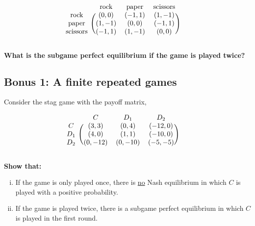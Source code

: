 \documentclass[10pt]{article}
\begin{document}
\begin{equation*}
    \begin{blockarray}{cccc}
        & \text{rock} & \text{paper} & \text{scissors} \\
        \begin{block}{c(ccc)}
            \text{rock}     & (0, 0)  & (-1, 1) & (1, -1) \\
            \text{paper}    & (1, -1) & (0, 0) & (-1, 1) \\
            \text{scissors} & (-1, 1) & (1, -1) & (0, 0) \\
        \end{block}
    \end{blockarray}\qquad
\end{equation*}

\textbf{What is the subgame perfect equilibrium if the game is played twice?}

\subsection*{Bonus 1: A finite repeated games}

Consider the stag game with the payoff matrix,

\begin{equation*}
    \begin{blockarray}{cccc}
        & C & D_1 & D_2 \\
        \begin{block}{c(ccc)}
            C   & (3, 3)   & (0, 4)   & (-12, 0) \\
            D_1 & (4, 0)   & (1, 1)   & (-10, 0) \\
            D_2 & (0, -12) & (0, -10) & (-5, -5) \\
        \end{block}
    \end{blockarray}\qquad
\end{equation*}

\textbf{Show that:}

\begin{enumerate}[(i)]
    \item If the game is only played once, there is \underline{no} Nash equilibrium
    in which \(C\) is played with a positive probability.
    \item If the game is played twice, there is a subgame perfect equilibrium
    in which \(C\) is played in the first round.
\end{enumerate}
\end{document}
